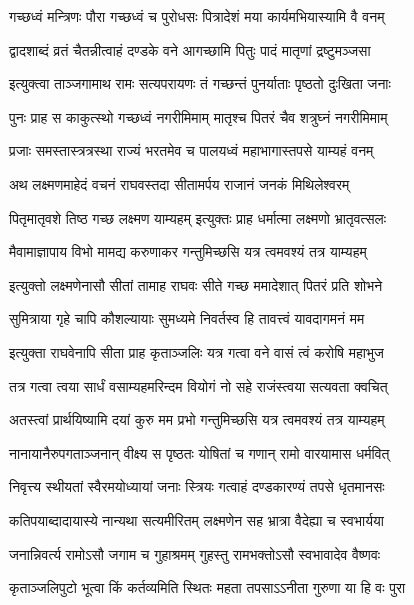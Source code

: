 \twolineshloka
{गच्छध्वं मन्त्रिणः पौरा गच्छध्वं च पुरोधसः}
{पित्रादेशं मया कार्यमभियास्यामि वै वनम्} %

\twolineshloka
{द्वादशाब्दं व्रतं चैतन्नीत्वाहं दण्डके वने}
{आगच्छामि पितुः पादं मातृणां द्रष्टुमञ्जसा} %

\twolineshloka
{इत्युक्त्वा ताञ्जगामाथ रामः सत्यपरायणः}
{तं गच्छन्तं पुनर्याताः पृष्ठतो दुःखिता जनाः} %

\twolineshloka
{पुनः प्राह स काकुत्स्थो गच्छध्वं नगरीमिमाम्}
{मातृश्च पितरं चैव शत्रुघ्नं नगरीमिमाम्} %

\twolineshloka
{प्रजाः समस्तास्त्रत्रस्था राज्यं भरतमेव च}
{पालयध्वं महाभागास्तपसे याम्यहं वनम्} %

\twolineshloka
{अथ लक्ष्मणमाहेदं वचनं राघवस्तदा}
{सीतामर्पय राजानं जनकं मिथिलेश्वरम्} %

\twolineshloka
{पितृमातृवशे तिष्ठ गच्छ लक्ष्मण याम्यहम्}
{इत्युक्तः प्राह धर्मात्मा लक्ष्मणो भ्रातृवत्सलः} %

\twolineshloka
{मैवामाज्ञापाय विभो मामद्य करुणाकर}
{गन्तुमिच्छसि यत्र त्वमवश्यं तत्र याम्यहम्} %

\twolineshloka
{इत्युक्तो लक्ष्मणेनासौ सीतां तामाह राघवः}
{सीते गच्छ ममादेशात् पितरं प्रति शोभने} %

\twolineshloka
{सुमित्राया गृहे चापि कौशल्यायाः सुमध्यमे}
{निवर्तस्व हि तावत्त्वं यावदागमनं मम} %

\twolineshloka
{इत्युक्ता राघवेनापि सीता प्राह कृताञ्जलिः}
{यत्र गत्वा वने वासं त्वं करोषि महाभुज} %

\twolineshloka
{तत्र गत्वा त्वया सार्धं वसाम्यहमरिन्दम}
{वियोगं नो सहे राजंस्त्वया सत्यवता क्वचित्} %

\twolineshloka
{अतस्त्वां प्रार्थयिष्यामि दयां कुरु मम प्रभो}
{गन्तुमिच्छसि यत्र त्वमवश्यं तत्र याम्यहम्} %

\twolineshloka
{नानायानैरुपगताञ्जनान् वीक्ष्य स पृष्ठतः}
{योषितां च गणान् रामो वारयामास धर्मवित्} %

\twolineshloka
{निवृत्त्य स्थीयतां स्वैरमयोध्यायां जनाः स्त्रियः}
{गत्वाहं दण्डकारण्यं तपसे धृतमानसः} %

\twolineshloka
{कतिपयाब्दादायास्ये नान्यथा सत्यमीरितम्}
{लक्ष्मणेन सह भ्रात्रा वैदेह्या च स्वभार्यया} %

\twolineshloka
{जनान्निवर्त्य रामोऽसौ जगाम च गुहाश्रमम्}
{गुहस्तु रामभक्तोऽसौ स्वभावादेव वैष्णवः} %

\twolineshloka
{कृताञ्जलिपुटो भूत्वा किं कर्तव्यमिति स्थितः}
{महता तपसाऽऽनीता गुरुणा या हि वः पुरा} %

